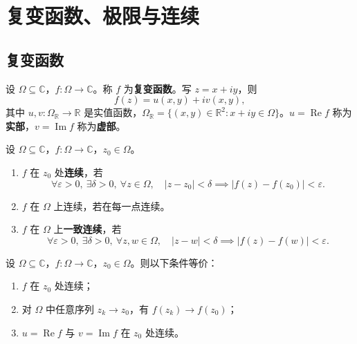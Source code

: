 \section{复变函数、极限与连续}

\subsection{复变函数}

\begin{definition}[复变函数]\label{def:ca_complex_function}
设 $\Omega \subseteq \mathbb{C}$，$f: \Omega \to \mathbb{C}$。称 $f$ 为\textbf{复变函数}。写 $z = x + iy$，则
\[
f(z) = u(x, y) + i v(x, y),
\]
其中 $u, v: \Omega_{\mathbb{R}} \to \mathbb{R}$ 是实值函数，$\Omega_{\mathbb{R}} = \{(x, y) \in \mathbb{R}^2 : x + iy \in \Omega\}$。$u = \operatorname{Re} f$ 称为\textbf{实部}，$v = \operatorname{Im} f$ 称为\textbf{虚部}。
\end{definition}

\begin{definition}[复极限与连续]\label{def:ca_limit_continuous}
设 $\Omega \subseteq \mathbb{C}$，$f: \Omega \to \mathbb{C}$，$z_0 \in \Omega$。
\begin{enumerate}[label=(\roman*)]
    \item $f$ 在 $z_0$ 处\textbf{连续}，若
    \[
    \forall \varepsilon > 0,\ \exists \delta > 0,\ \forall z \in \Omega,\quad |z - z_0| < \delta \implies |f(z) - f(z_0)| < \varepsilon.
    \]
    \item $f$ 在 $\Omega$ 上连续，若在每一点连续。
    \item $f$ 在 $\Omega$ 上\textbf{一致连续}，若
    \[
    \forall \varepsilon > 0,\ \exists \delta > 0,\ \forall z, w \in \Omega,\quad |z - w| < \delta \implies |f(z) - f(w)| < \varepsilon.
    \]
\end{enumerate}
\end{definition}

\begin{proposition}[连续的等价刻画]\label{prop:ca_continuity_equivalent}
设 $\Omega \subseteq \mathbb{C}$，$f: \Omega \to \mathbb{C}$，$z_0 \in \Omega$。则以下条件等价：
\begin{enumerate}[label=(\roman*)]
    \item $f$ 在 $z_0$ 处连续；
    \item 对 $\Omega$ 中任意序列 $z_k \to z_0$，有 $f(z_k) \to f(z_0)$；
    \item $u = \operatorname{Re} f$ 与 $v = \operatorname{Im} f$ 在 $z_0$ 处连续。
\end{enumerate}
\end{proposition}

